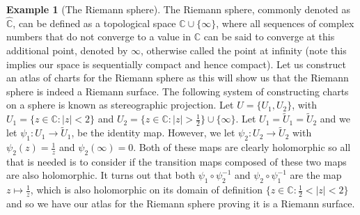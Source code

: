 \documentclass[11pt]{report}
\theoremstyle{definition}
\newtheorem{example}[thm]{Example}
\begin{document}
\begin{example}[The Riemann sphere]
  The Riemann sphere, commonly denoted as $\widehat{\mathbb{C}}$, can be defined as a topological space $\mathbb{C} \cup \{\infty\}$, where all sequences of complex numbers that do not converge to a value in $\mathbb{C}$ can be said to converge at this additional point, denoted by $\infty$, otherwise called the point at infinity (note this implies our space is sequentially compact and hence compact). Let us construct an atlas of charts for the Riemann sphere as this will show us that the Riemann sphere is indeed a Riemann surface. The following system of constructing charts on a sphere is known as stereographic projection. Let $U=\{U_1,U_2\}$, with $U_1=\{z \in \mathbb{C} : |z| < 2\}$ and $U_2=\{z \in \mathbb{C} : |z| > \frac{1}{2}\}\cup \{\infty\}$. Let $U_1=\tilde{U}_1=\tilde{U}_2$ and we let $\psi_1:U_1 \rightarrow \tilde{U}_1$, be the identity map. However, we let $\psi_2:U_2 \rightarrow \tilde{U}_2$ with $\psi_2(z)=\frac{1}{z}$ and $\psi_2(\infty)=0$. Both of these maps are clearly holomorphic so all that is needed is to consider if the transition maps composed of these two maps are also holomorphic.
  It turns out that both $\psi_1 \circ \psi_2 ^{-1}$ and $\psi_2 \circ \psi_1 ^{-1}$ are the map $z \mapsto \frac{1}{z}$, which is also holomorphic on its domain of definition $\{z\in \mathbb{C} : \frac{1}{2} < |z| < 2\}$ and so we have our atlas for the Riemann sphere proving it is a Riemann surface.
\end{example}
\end{document}

